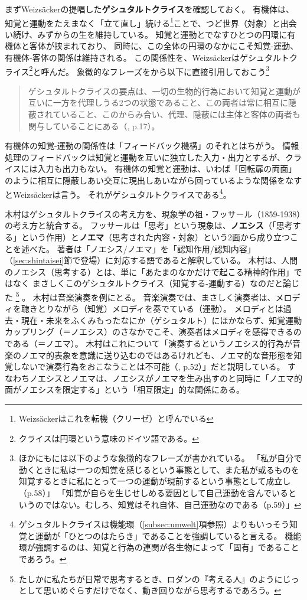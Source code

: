 まずWeizsäcker\cite{weizsaecker:1950}の提唱した\textbf{ゲシュタルトクライス}を確認しておく。
有機体は、知覚と運動をたえまなく「立て直し」続ける\footnote{Weizsäckerはこれを転機（クリーゼ）と呼んでいる}ことで、つど世界（対象）と出会い続け、みずからの生を維持している。
知覚と運動とでなすひとつの円環に有機体と客体が挟まれており、
同時に、この全体の円環のなかにこそ知覚-運動、有機体-客体の関係は維持される。
この関係性を、Weizsäckerはゲシュタルトクライス\footnote{クライスは円環という意味のドイツ語である。}と呼んだ。
象徴的なフレーズを\cite{weizsaecker:1950}から以下に直接引用しておこう\footnote{
ほかにも\cite{weizsaecker:1950}には以下のような象徴的なフレーズが書かれている。
「私が自分で動くときに私は一つの知覚を感じるという事態として、また私が或るものを知覚するときに私にとって一つの運動が現前するという事態として成立し（p.58）」
「知覚が自らを生じせしめる要因として自己運動を含んでいるというのではない。むしろ、知覚はそれ自体、自己運動なのである（p.59）」
}
\begin{quote}
ゲシュタルトクライスの要点は、一切の生物的行為において知覚と運動が互いに一方を代理しうる2つの状態であること、この両者は常に相互に隠蔽されていること、このからみ合い、代理、隠蔽には主体と客体の両者も関与していることにある（\cite{weizsaecker:1950}, p.17）。
\end{quote}

有機体の知覚-運動の関係性は「フィードバック機構」のそれとはちがう。
情報処理のフィードバックは知覚と運動を互いに独立した入力・出力とするが、クライスには入力も出力もない。
有機体の知覚と運動は、いわば「回転扉の両面」のように相互に隠蔽しあい交互に現出しあいながら回っているような関係をなすとWeizsäckerは言う。
それがゲシュタルトクライスである\footnote{
ゲシュタルトクライスは機能環（\ref{subsec:umwelt}項参照）よりもいっそう知覚と運動が「ひとつのはたらき」であることを強調していると言える。
機能環が強調するのは、知覚と行為の連関が各生物によって「固有」であることであろう。
}。

木村\cite{kimura:2005}はゲシュタルトクライスの考え方を、現象学の祖・フッサール（1859-1938）の考え方と統合する。
フッサールは「思考」という現象は、\textbf{ノエシス}（「思考する」という作用）と\textbf{ノエマ}（思考された内容・対象）という2面から成り立つことを述べた。
著者は「ノエシス/ノエマ」を「認知作用/認知内容」（\ref{sec:shintaisei}節で登場）に対応する語であると解釈している。
木村は、人間のノエシス（思考する）とは、単に「あたまのなかだけで起こる精神的作用」ではなく
まさしくこのゲシュタルトクライス（知覚する-運動する）なのだと論じた
\footnote{たしかに私たちが日常で思考するとき、ロダンの『考える人』のようにじっとして思いめぐらすだけでなく、動き回りながら思考する\cite{saeki:1990}であろう。}
。
木村は音楽演奏を例にとる。
音楽演奏では、まさしく演奏者は、メロディを聴きとりながら（知覚）メロディを奏でている（運動）。
メロディとは過去・現在・未来をふくみもったなにか（ゲシュタルト）にほかならず、知覚運動カップリング（＝ノエシス）のさなかでこそ、演奏者はメロディを感得できるのである（＝ノエマ）。
木村はこれについて「演奏するというノエシス的行為が音楽のノエマ的表象を意識に送り込むのではあるけれども、ノエマ的な音形態を知覚しないで演奏行為をおこなうことは不可能（\cite{kimura:2005}, p.52）」だと説明している。
すなわちノエシスとノエマは、ノエシスがノエマを生み出すのと同時に「ノエマ的面がノエシスを限定する」という「相互限定」的な関係にある。

